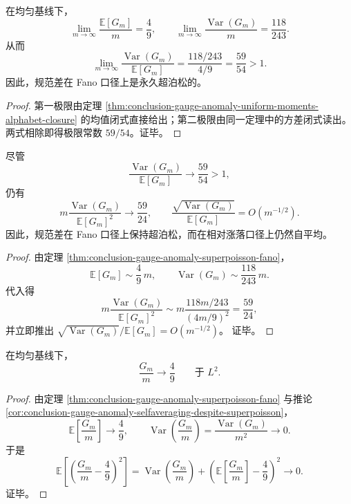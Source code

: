 \begin{theorem}\label{thm:conclusion-gauge-anomaly-superpoisson-fano}
在均匀基线下，
\[
\lim_{m\to\infty}\frac{\mathbb E[G_m]}{m}=\frac49,
\qquad
\lim_{m\to\infty}\frac{\operatorname{Var}(G_m)}{m}=\frac{118}{243}.
\]
从而
\[
\lim_{m\to\infty}\frac{\operatorname{Var}(G_m)}{\mathbb E[G_m]}
=
\frac{118/243}{4/9}
=
\frac{59}{54}>1.
\]
因此，规范差在 Fano 口径上是永久超泊松的。
\end{theorem}
\begin{proof}
第一极限由定理 \ref{thm:conclusion-gauge-anomaly-uniform-moments-alphabet-closure} 的均值闭式直接给出；第二极限由同一定理中的方差闭式读出。
两式相除即得极限常数 \(59/54\)。证毕。
\end{proof}

\begin{corollary}[超泊松与自平均的并存]\label{cor:conclusion-gauge-anomaly-selfaveraging-despite-superpoisson}
尽管
\[
\frac{\operatorname{Var}(G_m)}{\mathbb E[G_m]}\to \frac{59}{54}>1,
\]
仍有
\[
m\frac{\operatorname{Var}(G_m)}{\mathbb E[G_m]^2}\longrightarrow \frac{59}{24},
\qquad
\frac{\sqrt{\operatorname{Var}(G_m)}}{\mathbb E[G_m]}=O(m^{-1/2}).
\]
因此，规范差在 Fano 口径上保持超泊松，而在相对涨落口径上仍然自平均。
\end{corollary}
\begin{proof}
由定理 \ref{thm:conclusion-gauge-anomaly-superpoisson-fano}，
\[
\mathbb E[G_m]\sim \frac49\,m,
\qquad
\operatorname{Var}(G_m)\sim \frac{118}{243}\,m.
\]
代入得
\[
m\frac{\operatorname{Var}(G_m)}{\mathbb E[G_m]^2}
\sim
m\frac{118m/243}{(4m/9)^2}
=
\frac{59}{24},
\]
并立即推出
\(
\sqrt{\operatorname{Var}(G_m)}/\mathbb E[G_m]=O(m^{-1/2})
\)。
证毕。
\end{proof}

\begin{theorem}\label{thm:conclusion-gauge-anomaly-l2-law}
在均匀基线下，
\[
\frac{G_m}{m}\longrightarrow \frac49
\qquad\text{于 }L^2.
\]
\end{theorem}
\begin{proof}
由定理 \ref{thm:conclusion-gauge-anomaly-superpoisson-fano} 与推论 \ref{cor:conclusion-gauge-anomaly-selfaveraging-despite-superpoisson}，
\[
\mathbb E\!\left[\frac{G_m}{m}\right]\to \frac49,
\qquad
\operatorname{Var}\!\left(\frac{G_m}{m}\right)=\frac{\operatorname{Var}(G_m)}{m^2}\to 0.
\]
于是
\[
\mathbb E\!\left[\left(\frac{G_m}{m}-\frac49\right)^2\right]
=
\operatorname{Var}\!\left(\frac{G_m}{m}\right)
+\left(\mathbb E\!\left[\frac{G_m}{m}\right]-\frac49\right)^2
\longrightarrow 0.
\]
证毕。
\end{proof}

